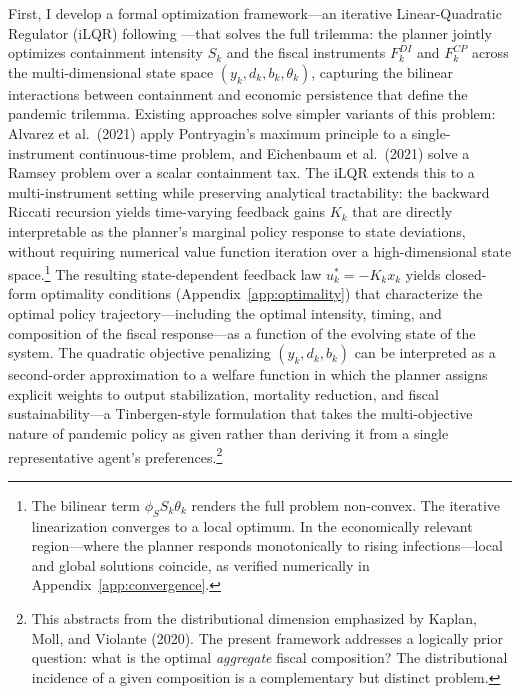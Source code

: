 First, I develop a formal optimization framework---an iterative Linear-Quadratic
Regulator (iLQR) following \citet{bertsekas2017}---that solves the full trilemma: the
planner jointly optimizes containment intensity $S_k$ and the fiscal instruments
$F_k^{DI}$ and $F_k^{CP}$ across the multi-dimensional state space
$(y_k, d_k, b_k, \theta_k)$, capturing the bilinear interactions between containment
and economic persistence that define the pandemic trilemma. Existing approaches solve
simpler variants of this problem: Alvarez et al.\ (2021) apply Pontryagin's maximum
principle to a single-instrument continuous-time problem, and Eichenbaum et al.\
(2021) solve a Ramsey problem over a scalar containment tax. The iLQR extends this
to a multi-instrument setting while preserving analytical tractability: the
backward Riccati recursion yields time-varying feedback gains $K_k$ that are directly
interpretable as the planner's marginal policy response to state deviations, without
requiring numerical value function iteration over a high-dimensional state
space.\footnote{The bilinear term $\phi_S S_k \theta_k$ renders the full problem
non-convex. The iterative linearization converges to a local optimum. In the
economically relevant region---where the planner responds monotonically to rising
infections---local and global solutions coincide, as verified numerically in
Appendix~\ref{app:convergence}.} The resulting state-dependent feedback law
$u_k^* = -K_k x_k$ yields closed-form optimality conditions
(Appendix~\ref{app:optimality}) that characterize the optimal policy
trajectory---including the optimal intensity, timing, and composition of the fiscal
response---as a function of the evolving state of the system. The quadratic objective
penalizing $(y_k, d_k, b_k)$ can be interpreted as a second-order approximation to a
welfare function in which the planner assigns explicit weights to output stabilization,
mortality reduction, and fiscal sustainability---a Tinbergen-style formulation that
takes the multi-objective nature of pandemic policy as given rather than deriving it
from a single representative agent's preferences.\footnote{This abstracts from the
distributional dimension emphasized by Kaplan, Moll, and Violante (2020). The
present framework addresses a logically prior question: what is the optimal
\textit{aggregate} fiscal composition? The distributional incidence of a given
composition is a complementary but distinct problem.}

